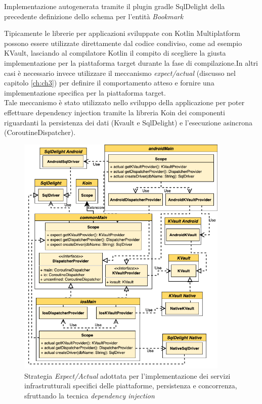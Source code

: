 \begin{listing}[H]
\inputminted{kotlin}{code/5-sqldelight1}
\caption{Implementazione autogenerata tramite il plugin gradle SqlDelight della precedente definizione dello schema per l'entità \textit{Bookmark}}
\end{listing}

Tipicamente le librerie per applicazioni sviluppate con Kotlin Multiplatform possono essere utilizzate direttamente dal codice condiviso, come ad esempio KVault, lasciando al compilatore Kotlin il compito di scegliere la giusta implementazione per la piattaforma target durante la fase di compilazione.In altri casi è necessario invece utilizzare il meccanismo \textit{expect/actual} (discusso nel capitolo \ref{ch:ch3}) per definire il comportamento atteso e fornire una implementazione specifica per la piattaforma target.\\
Tale meccanismo è stato utilizzato nello sviluppo della applicazione per poter effettuare dependency injection tramite la libreria Koin dei componenti riguardanti la persistenza dei dati (Kvault e SqlDelight) e l'esecuzione asincrona (CoroutineDispatcher).

\begin{figure}[H]
\centering
\includegraphics[width=0.9\textwidth]{img/tesi-21-expectactual.drawio.png}
\caption{Strategia \textit{Expect/Actual} adottata per l'implementazione dei servizi infrastrutturali specifici delle piattaforme, persistenza e concorrenza, sfruttando la tecnica \textit{dependency injection}}
\end{figure}

